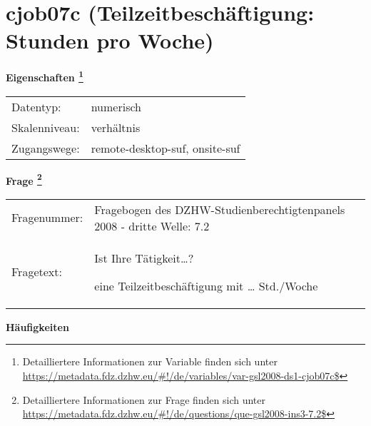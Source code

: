 
    \setcounter{footnote}{0}

    \vspace*{-1.8cm}
	\section{cjob07c (Teilzeitbeschäftigung: Stunden pro Woche)}
	\label{section:cjob07c}



    \vspace*{0.5cm}
    \noindent\textbf{Eigenschaften
	\footnote{Detailliertere Informationen zur Variable finden sich unter
		\url{https://metadata.fdz.dzhw.eu/\#!/de/variables/var-gsl2008-ds1-cjob07c$}}}\\
	\begin{tabularx}{\hsize}{@{}lX}
	Datentyp: & numerisch \\
	Skalenniveau: & verhältnis \\
	Zugangswege: &
	  remote-desktop-suf, 
	  onsite-suf
 \\
    \end{tabularx}



				\vspace*{0.5cm}
                \noindent\textbf{Frage
	                \footnote{Detailliertere Informationen zur Frage finden sich unter
		              \url{https://metadata.fdz.dzhw.eu/\#!/de/questions/que-gsl2008-ins3-7.2$}}}\\
				\begin{tabularx}{\hsize}{@{}lX}
					Fragenummer: &
					  Fragebogen des DZHW-Studienberechtigtenpanels 2008 - dritte Welle:
					  7.2
 \\
					Fragetext: & Ist Ihre Tätigkeit…?\par  eine Teilzeitbeschäftigung mit … Std./Woche \\
				\end{tabularx}





        		\vspace*{0.5cm}
                \noindent\textbf{Häufigkeiten}

